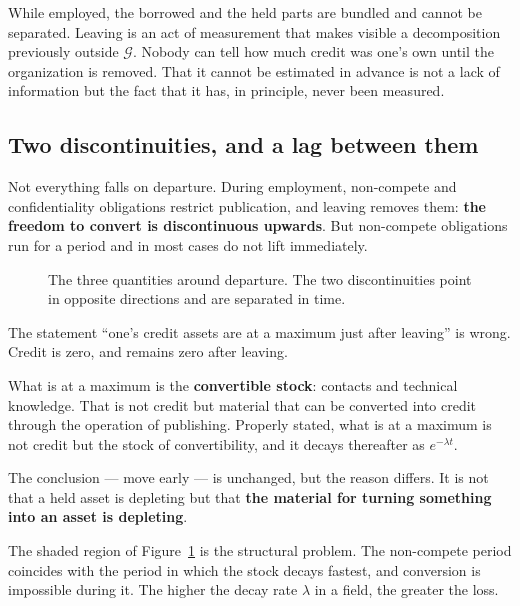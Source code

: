 \begin{remark}
While employed, the borrowed and the held parts are bundled and cannot be separated. Leaving
is an act of measurement that makes visible a decomposition previously outside $\mathcal{G}$.
Nobody can tell how much credit was one's own until the organization is removed. That it
cannot be estimated in advance is not a lack of information but the fact that it has, in
principle, never been measured.
\end{remark}

\subsection{Two discontinuities, and a lag between them}

Not everything falls on departure. During employment, non-compete and confidentiality
obligations restrict publication, and leaving removes them:
\textbf{the freedom to convert is discontinuous upwards}. But non-compete obligations run
for a period and in most cases do not lift immediately.

\begin{figure}[htbp]
\centering
{}
\caption{The three quantities around departure. The two discontinuities point in opposite directions and are separated in time.}
\label{fig:credit-jump}
\end{figure}

\begin{remark}
The statement ``one's credit assets are at a maximum just after leaving'' is wrong. Credit is
zero, and remains zero after leaving.

What is at a maximum is the \textbf{convertible stock}: contacts and technical knowledge.
That is not credit but material that can be converted into credit through the operation of
publishing. Properly stated, what is at a maximum is not credit but the stock of
convertibility, and it decays thereafter as $e^{-\lambda t}$.

The conclusion --- move early --- is unchanged, but the reason differs. It is not that a held
asset is depleting but that \textbf{the material for turning something into an asset is
depleting}.
\end{remark}

The shaded region of Figure~\ref{fig:credit-jump} is the structural problem. The non-compete
period coincides with the period in which the stock decays fastest, and conversion is
impossible during it. The higher the decay rate $\lambda$ in a field, the greater the loss.

